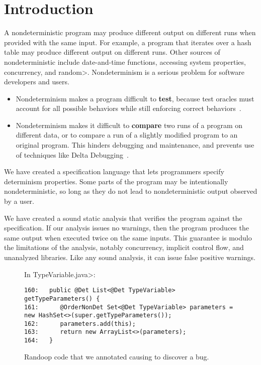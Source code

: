 \section{Introduction\label{sec:introduction}}

A nondeterministic program may produce different output on different runs
when provided with the same input.
For example, a program that iterates over a hash table
may produce different output on different runs.
Other sources of nondeterministic include
date-and-time functions,
accessing system properties,
concurrency,
and \<random>.
%
Nondeterminism is a serious problem for software developers and users.
\begin{itemize}
\item
  Nondeterminism makes a program difficult to \textbf{test}, because test
  oracles must account for all possible behaviors while still enforcing
  correct behaviors~\cite{LuoHEM2014,ShiGLM2016,BellLHEYM2018,Sudarshan}.
\item
  Nondeterminism makes it difficult to \textbf{compare} two runs of a
  program on different data, or to compare a run of a slightly modified
  program to an original program.  This hinders debugging and maintenance,
  and prevents use of techniques like Delta Debugging~\cite{Zeller1999,YuLCZ2012}.
\end{itemize}


We have created a specification language that lets programmers specify
determinism properties.
Some parts of the program may be intentionally nondeterministic, so long
as they do not lead to nondeterministic output observed by a user.  

We have created a sound static analysis that verifies the program against the specification.
If our analysis issues no warnings, then the program produces the same
output when executed twice on the same inputs.  This guarantee is modulo
the limitations of the
analysis, notably 
concurrency, implicit control flow, and unanalyzed libraries.
Like any
sound analysis, it can issue false positive warnings.

\begin{figure*}

\noindent
In \<TypeVariable.java>:

\begin{Verbatim}
160:   public @Det List<@Det TypeVariable> getTypeParameters() {
161:      @OrderNonDet Set<@Det TypeVariable> parameters = new HashSet<>(super.getTypeParameters());
162:      parameters.add(this);
163:      return new ArrayList<>(parameters);
164:   }
\end{Verbatim}

\caption{Randoop code that we annotated causing \theDeterminismChecker to discover a bug.}
\label{fig:randoop-bug-hashset}
\end{figure*}


